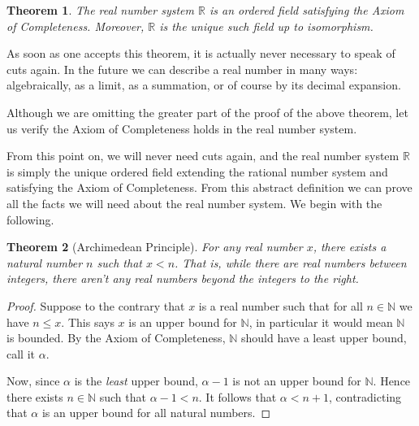 \documentclass[11pt,oneside]{amsbook}
\newcommand{\N}{\mathbb N}
\newcommand{\R}{\mathbb R}
\theoremstyle{definition}
\theoremstyle{plain}
\newtheorem{theorem}{Theorem}[section]
\theoremstyle{definition}
\theoremstyle{remark}
\numberwithin{equation}{section}
\numberwithin{figure}{section}
\begin{document}
\begin{theorem}
  The real number system $\R$ is an ordered field satisfying the Axiom of Completeness. Moreover, $\R$ is the unique such field up to isomorphism.
\end{theorem}

As soon as one accepts this theorem, it is actually never necessary to speak of cuts again. In the future we can describe a real number in many ways: algebraically, as a limit, as a summation, or of course by its decimal expansion.

Although we are omitting the greater part of the proof of the above theorem, let us verify the Axiom of Completeness holds in the real number system.

From this point on, we will never need cuts again, and the real number system $\R$ is simply the unique ordered field extending the rational number system and satisfying the Axiom of Completeness. From this abstract definition we can prove all the facts we will need about the real number system. We begin with the following.

\begin{theorem}[Archimedean Principle]
  For any real number $x$, there exists a natural number $n$ such that $x<n$. That is, while there are real numbers between integers, there aren't any real numbers beyond the integers to the right.
\end{theorem}

\begin{proof}
  Suppose to the contrary that $x$ is a real number such that for all $n\in\N$ we have $n\leq x$. This says $x$ is an upper bound for $\N$, in particular it would mean $\N$ is bounded. By the Axiom of Completeness, $\N$ should have a least upper bound, call it $\alpha$.

  Now, since $\alpha$ is the \emph{least} upper bound, $\alpha-1$ is not an upper bound for $\N$. Hence there exists $n\in\N$ such that $\alpha-1<n$. It follows that $\alpha<n+1$, contradicting that $\alpha$ is an upper bound for all natural numbers.
\end{proof}

\begin{center}
\end{center}
\end{document}
